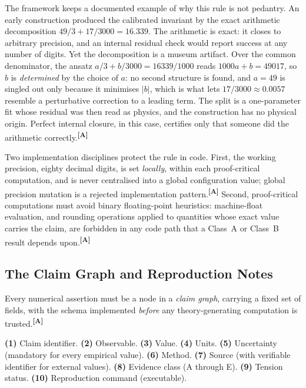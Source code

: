 \documentclass[12pt,a4paper,twoside]{article}
\theoremstyle{plain}
\theoremstyle{definition}
\theoremstyle{remark}
\newcommand{\catmark}[1]{\textsuperscript{\textsf{\textbf{[#1]}}}}
\begin{document}
\noindent The framework keeps a documented example of why this rule is
not pedantry. An early construction produced the calibrated invariant by
the exact arithmetic decomposition $49/3 + 17/3000 = 16.339$. The
arithmetic is exact: it closes to arbitrary precision, and an internal
residual check would report success at any number of digits. Yet the
decomposition is a museum artifact. Over the common denominator, the
ansatz $a/3 + b/3000 = 16339/1000$ reads $1000a + b = 49017$, so $b$ is
\emph{determined} by the choice of $a$: no second structure is found,
and $a = 49$ is singled out only because it minimises $|b|$, which is
what lets $17/3000 \approx 0.0057$ resemble a perturbative correction
to a leading term. The split is a one-parameter fit whose residual was
then read as physics, and the construction has no physical origin.
Perfect internal closure, in this case, certifies only that someone
did the arithmetic correctly.\catmark{A}

Two implementation disciplines protect the rule in code. First, the
working precision, eighty decimal digits, is set \emph{locally}, within
each proof-critical computation, and is never centralised into a global
configuration value; global precision mutation is a rejected
implementation pattern.\catmark{A} Second, proof-critical computations
must avoid binary floating-point heuristics: machine-float evaluation,
and rounding operations applied to quantities whose exact value carries
the claim, are forbidden in any code path that a Class~A or Class~B
result depends upon.\catmark{A}

\subsection{The Claim Graph and Reproduction Notes}
\label{subsec:claim-graph}

Every numerical assertion must be a node in a \emph{claim graph},
carrying a fixed set of fields, with the schema implemented \emph{before}
any theory-generating computation is trusted.\catmark{A}

\begin{governancebox}
\textbf{(1)} Claim identifier. \quad \textbf{(2)} Observable. \quad
\textbf{(3)} Value. \quad \textbf{(4)} Units. \quad
\textbf{(5)} Uncertainty (mandatory for every empirical value). \quad
\textbf{(6)} Method. \quad \textbf{(7)} Source (with verifiable
identifier for external values). \quad \textbf{(8)} Evidence class (A
through E). \quad \textbf{(9)} Tension status. \quad
\textbf{(10)} Reproduction command (executable).
\end{governancebox}
\end{document}
